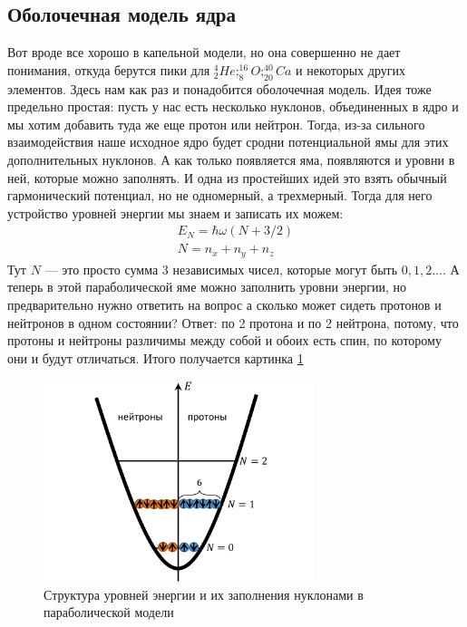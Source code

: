 \documentclass[12pt]{article}
\begin{document}
\subsection{Оболочечная модель ядра}
Вот вроде все хорошо в капельной модели, но она совершенно не дает понимания, откуда берутся пики для $^4_2He; ^{16}_8O; ^{40}_{20}Ca$ и некоторых других элементов. Здесь нам как раз и понадобится оболочечная модель. Идея тоже предельно простая: пусть у нас есть несколько нуклонов, объединенных  в ядро и мы хотим добавить туда же еще протон или нейтрон. Тогда, из-за сильного взаимодействия наше исходное ядро будет сродни потенциальной ямы для этих дополнительных нуклонов. А как только появляется яма, появляются и уровни в ней, которые можно заполнять. И одна из простейших идей это взять обычный гармонический потенциал, но не одномерный, а трехмерный. Тогда для него устройство уровней энергии мы знаем и записать их можем:
\begin{gather*}
    E_N=\hbar \omega (N+3/2)\\
    N=n_x+n_y+n_z
\end{gather*}
Тут $N$ --- это просто сумма 3 независимых чисел, которые могут быть $0, 1, 2\dots$. А теперь в этой параболической яме можно заполнить уровни энергии, но предварительно нужно ответить на вопрос а сколько может сидеть протонов и нейтронов  в одном состоянии? Ответ: по 2 протона и по 2 нейтрона, потому, что протоны и нейтроны различимы между собой и обоих есть спин, по которому они и будут отличаться. Итого получается картинка \ref{fig:sem_09_parabol_pot}
\begin{figure}[h]
    \centering
    \includegraphics[width=0.7\textwidth,height=\textheight,keepaspectratio]{Seminar_09/pics/pic_parabol_pot.pdf}
    \caption{Структура уровней энергии и их заполнения нуклонами в параболической модели}
    \label{fig:sem_09_parabol_pot}
\end{figure}
\end{document}
